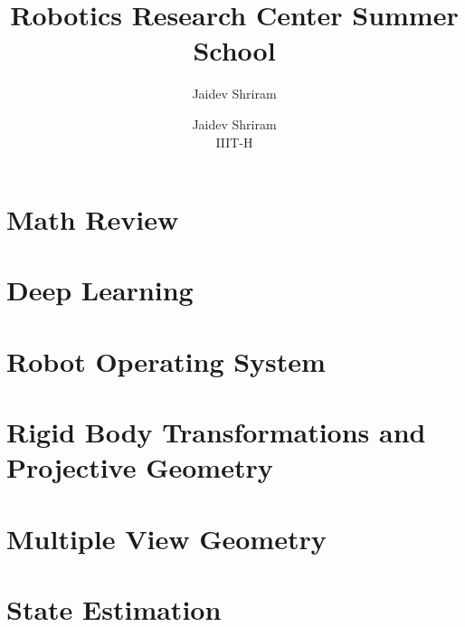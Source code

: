 \documentclass{report}
\title{\huge \textbf{Robotics Research Center Summer School}}
\author{Jaidev Shriram}
\date{}
\author{%
    Jaidev Shriram \\
    IIIT-H \\
}
\begin{document}


\tableofcontents{}

\setlength{\parskip}{\baselineskip}%
\setlength{\parindent}{0pt}%

\part{Math Review}





\part{Deep Learning}















\part{Robot Operating System}



\part{Rigid Body Transformations and Projective Geometry}





\part{Multiple View Geometry}











\part{State Estimation}
\end{document}
